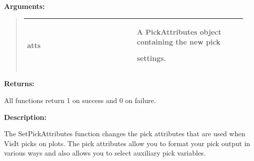 \documentclass[letterpaper,10pt,english]{sphinxmanual}
\begin{document}
\begin{DUlineblock}{0em}
\item[] 
\item[] \textbf{Arguments:}
\end{DUlineblock}
\begin{quote}

\begin{tabular}{|p{0.475\linewidth}|p{0.475\linewidth}|}
\hline

atts
 & 
\begin{DUlineblock}{0em}
\item[] A PickAttributes object containing the new pick
\item[] settings.
\end{DUlineblock}
\\
\hline\end{tabular}

\end{quote}

\begin{DUlineblock}{0em}
\item[] 
\item[] \textbf{Returns:}
\item[] All functions return 1 on success and 0 on failure.
\item[] 
\item[] \textbf{Description:}
\item[] The SetPickAttributes function changes the pick attributes that are used
when VisIt picks on plots. The pick attributes allow you to format your
pick output in various ways and also allows you to select auxiliary pick
variables.
\end{DUlineblock}

\begin{DUlineblock}{0em}
\item[] 
\end{DUlineblock}
\end{document}

